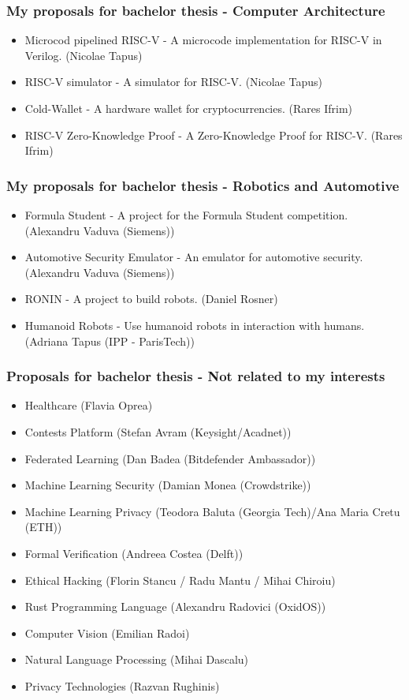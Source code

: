 \begin{frame}
\frametitle{My proposals for bachelor thesis - Computer Architecture}
\begin{itemize}
    \item Microcod pipelined RISC-V - A microcode implementation for RISC-V in Verilog. (Nicolae Tapus)
    \item RISC-V simulator - A simulator for RISC-V. (Nicolae Tapus)
    \item Cold-Wallet - A hardware wallet for cryptocurrencies. (Rares Ifrim)
    \item RISC-V Zero-Knowledge Proof - A Zero-Knowledge Proof for RISC-V. (Rares Ifrim)
\end{itemize}
\end{frame}

\begin{frame}
\frametitle{My proposals for bachelor thesis - Robotics and Automotive}
\begin{itemize}
    \item Formula Student - A project for the Formula Student competition. (Alexandru Vaduva (Siemens))
    \item Automotive Security Emulator - An emulator for automotive security. (Alexandru Vaduva (Siemens))
    \item RONIN - A project to build robots. (Daniel Rosner)
    \item Humanoid Robots - Use humanoid robots in interaction with humans. (Adriana Tapus (IPP - ParisTech))
\end{itemize}
\end{frame}

\begin{frame}
\frametitle{Proposals for bachelor thesis - Not related to my interests}
\begin{itemize}
    \item Healthcare (Flavia Oprea)
    \item Contests Platform (Stefan Avram (Keysight/Acadnet))
    \item Federated Learning (Dan Badea (Bitdefender Ambassador))
    \item Machine Learning Security (Damian Monea (Crowdstrike))
    \item Machine Learning Privacy (Teodora Baluta (Georgia Tech)/Ana Maria Cretu (ETH))
    \item Formal Verification (Andreea Costea (Delft))
    \item Ethical Hacking (Florin Stancu / Radu Mantu / Mihai Chiroiu)
    \item Rust Programming Language (Alexandru Radovici (OxidOS))
    \item Computer Vision (Emilian Radoi)
    \item Natural Language Processing (Mihai Dascalu)
    \item Privacy Technologies (Razvan Rughinis)
\end{itemize}
\end{frame}